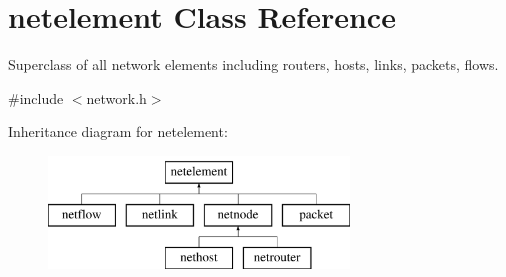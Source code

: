 \hypertarget{classnetelement}{\section{netelement Class Reference}
\label{classnetelement}
}


Superclass of all network elements including routers, hosts, links, packets, flows.  




{\ttfamily \#include $<$network.\-h$>$}

Inheritance diagram for netelement\-:\begin{figure}[H]
\begin{center}
\leavevmode
\includegraphics[height=3.000000cm]{classnetelement}
\end{center}
\end{figure}
